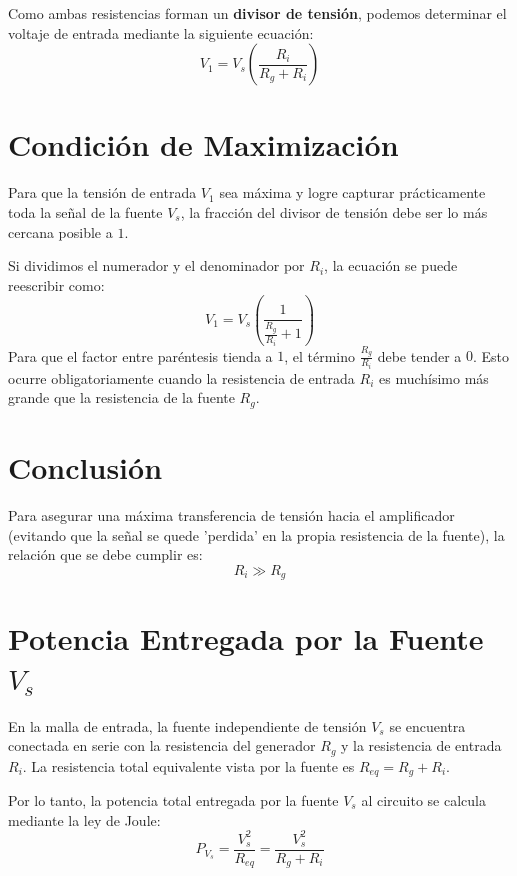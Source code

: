 \documentclass[12pt, a4paper]{article}
\begin{document}
Como ambas resistencias forman un \textbf{divisor de tensión}, podemos determinar el voltaje de entrada mediante la siguiente ecuación:
\begin{equation}
    V_1 = V_s \left( \frac{R_i}{R_g + R_i} \right)
\end{equation}

\section*{Condición de Maximización}
Para que la tensión de entrada $V_1$ sea máxima y logre capturar prácticamente toda la señal de la fuente $V_s$, la fracción del divisor de tensión debe ser lo más cercana posible a $1$. 

Si dividimos el numerador y el denominador por $R_i$, la ecuación se puede reescribir como:
\begin{equation}
    V_1 = V_s \left( \frac{1}{\frac{R_g}{R_i} + 1} \right)
\end{equation}
Para que el factor entre paréntesis tienda a $1$, el término $\frac{R_g}{R_i}$ debe tender a $0$. Esto ocurre obligatoriamente cuando la resistencia de entrada $R_i$ es muchísimo más grande que la resistencia de la fuente $R_g$.

\section*{Conclusión}
Para asegurar una máxima transferencia de tensión hacia el amplificador (evitando que la señal se quede 'perdida' en la propia resistencia de la fuente), la relación que se debe cumplir es:
\begin{equation}
    R_i \gg R_g
\end{equation}

\section*{Potencia Entregada por la Fuente $V_s$}
En la malla de entrada, la fuente independiente de tensión $V_s$ se encuentra conectada en serie con la resistencia del generador $R_g$ y la resistencia de entrada $R_i$. La resistencia total equivalente vista por la fuente es $R_{eq} = R_g + R_i$.

Por lo tanto, la potencia total entregada por la fuente $V_s$ al circuito se calcula mediante la ley de Joule:
\begin{equation}
    P_{V_s} = \frac{V_s^2}{R_{eq}} = \frac{V_s^2}{R_g + R_i}
\end{equation}
\end{document}
